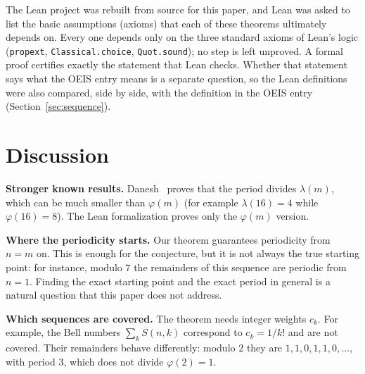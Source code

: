 \documentclass[11pt,a4paper]{article}
\theoremstyle{definition}
\theoremstyle{remark}
\newcommand{\para}[1]{\par\medskip\noindent\textbf{#1}\enspace}
\begin{document}
The Lean project was rebuilt from source for this paper, and Lean was asked to list the basic assumptions (axioms)
that each of these theorems ultimately depends on. Every one depends only on the three standard axioms of Lean's logic
(\texttt{propext}, \texttt{Classical.choice}, \texttt{Quot.sound}); no step is left unproved. A formal proof certifies
exactly the statement that Lean checks. Whether that statement says what the OEIS entry means is a separate question,
so the Lean definitions were also compared, side by side, with the definition in the OEIS entry
(Section~\ref{sec:sequence}).

\section{Discussion}\label{sec:discussion}

\para{Stronger known results.} Danesh~\cite{danesh} proves that the period divides $\lambda(m)$, which can be much smaller
than $\varphi(m)$ (for example $\lambda(16)=4$ while $\varphi(16)=8$). The Lean formalization proves only the
$\varphi(m)$ version.

\para{Where the periodicity starts.} Our theorem guarantees periodicity from $n=m$ on. This is enough for the conjecture,
but it is not always the true starting point: for instance, modulo $7$ the remainders of this sequence are periodic from $n=1$. Finding the exact starting point and the
exact period in general is a natural question that this paper does not address.

\para{Which sequences are covered.} The theorem needs integer weights $c_k$. For example, the Bell numbers
$\sum_kS(n,k)$ correspond to $c_k=1/k!$ and are not covered. Their remainders behave differently: modulo $2$ they are
$1,1,0,1,1,0,\dots$, with period $3$, which does not divide $\varphi(2)=1$.
\end{document}
